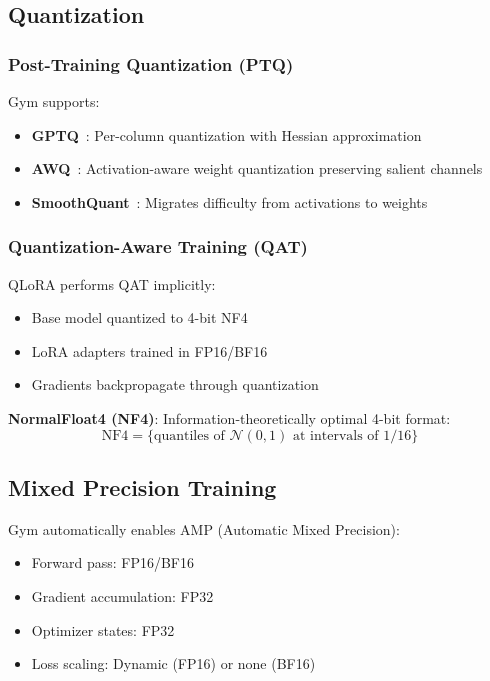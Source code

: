 \documentclass[11pt,letterpaper]{article}
\begin{document}
\subsection{Quantization}

\subsubsection{Post-Training Quantization (PTQ)}

Gym supports:
\begin{itemize}
\item \textbf{GPTQ}~\citep{frantar2023gptq}: Per-column quantization with Hessian approximation
\item \textbf{AWQ}~\citep{lin2023awq}: Activation-aware weight quantization preserving salient channels
\item \textbf{SmoothQuant}~\citep{xiao2023smoothquant}: Migrates difficulty from activations to weights
\end{itemize}

\subsubsection{Quantization-Aware Training (QAT)}

QLoRA performs QAT implicitly:
\begin{itemize}
\item Base model quantized to 4-bit NF4
\item LoRA adapters trained in FP16/BF16
\item Gradients backpropagate through quantization
\end{itemize}

\textbf{NormalFloat4 (NF4)}: Information-theoretically optimal 4-bit format:
\begin{equation}
\text{NF4} = \{\text{quantiles of } \mathcal{N}(0,1) \text{ at intervals of } 1/16\}
\end{equation}

\subsection{Mixed Precision Training}

Gym automatically enables AMP (Automatic Mixed Precision):
\begin{itemize}
\item Forward pass: FP16/BF16
\item Gradient accumulation: FP32
\item Optimizer states: FP32
\item Loss scaling: Dynamic (FP16) or none (BF16)
\end{itemize}
\end{document}
